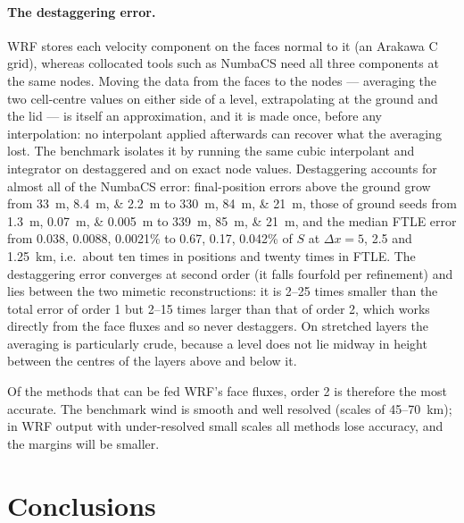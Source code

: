 \documentclass[11pt,a4paper]{article}
\begin{document}
\paragraph{The destaggering error.} WRF stores each velocity component on the
faces normal to it (an Arakawa C grid), whereas collocated tools such as
NumbaCS need all three components at the same nodes. Moving the data from the
faces to the nodes --- averaging the two cell-centre values on either side of
a level, extrapolating at the ground and the lid --- is itself an
approximation, and it is made once, before any interpolation: no interpolant
applied afterwards can recover what the averaging lost. The benchmark
isolates it by running the same cubic interpolant and integrator on
destaggered and on exact node values. Destaggering accounts for almost all of
the NumbaCS error: final-position errors above the ground grow from
\SIlist{33;8.4;2.2}{m} to \SIlist{330;84;21}{m}, those of ground seeds from
\SIlist{1.3;0.07;0.005}{m} to \SIlist{339;85;21}{m}, and the median FTLE error
from 0.038, 0.0088, 0.0021\% to 0.67, 0.17, 0.042\% of $S$ at $\Delta x=5$,
2.5 and \SI{1.25}{km}, i.e.\ about ten times in positions and twenty times in
FTLE. The destaggering error converges at second order (it falls fourfold per
refinement) and lies between the two mimetic reconstructions: it is 2--25
times smaller than the total error of order 1 but 2--15 times larger than that
of order 2, which works directly from the face fluxes and so never
destaggers. On stretched layers the averaging is particularly crude, because
a level does not lie midway in height between the centres of the layers above
and below it.

Of the methods that can be fed WRF's face fluxes, order 2 is therefore the
most accurate. The benchmark wind is smooth and well resolved (scales of
45--\SI{70}{km}); in WRF output with under-resolved small scales all methods
lose accuracy, and the margins will be smaller.

\section{Conclusions}
\end{document}
